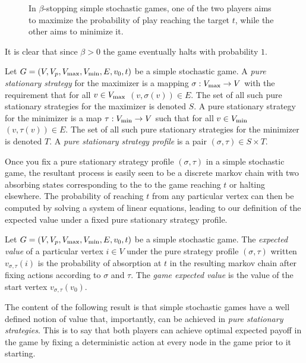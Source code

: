 \begin{figure}[h]
  \centering
  
  \caption{In $\beta$-stopping simple stochastic games, one of the two players aims to maximize the probability
  of play reaching the target $t$, while the other aims to minimize it.}
\end{figure}

It is clear that since $\beta > 0$ the game eventually halts with probability $1$. 
\begin{definition}
  Let $G = (V, V_p, V_{\max}, V_{\min}, E, v_0, t)$ be a simple stochastic game. A \emph{pure stationary strategy}
  for the maximizer is a mapping $\sigma : V_{\max} \to V$ with the requirement that for all $v \in V_{\max}$
  $(v, \sigma(v)) \in E$. The set of all such pure stationary strategies for the maximizer is denoted
  $S$. A pure stationary strategy for the minimizer is a map $\tau : V_{\min} \to V$ such that
  for all $v \in V_{\min}$ 
  $(v, \tau(v)) \in E$. The set of all such pure stationary strategies for the minimizer is denoted $T$. 
  A \emph{pure stationary strategy profile} is a pair $(\sigma, \tau) \in S \times T$.
\end{definition}
Once you fix a pure stationary strategy profile $(\sigma, \tau)$
in a simple stochastic game, the resultant process is easily seen
to be a discrete markov chain with two absorbing states corresponding to
the to the game reaching $t$ or halting elsewhere. The probability
of reaching $t$ from any particular vertex can then be computed 
by solving a system of linear equations, leading to our definition of the expected value under 
a fixed pure stationary strategy profile.
\begin{definition}
  Let $G = (V, V_p, V_{\max}, V_{\min}, E, v_0, t)$ be a simple stochastic game.
  The \emph{expected value} of
  a particular vertex $i \in V$ under the pure strategy profile 
  $(\sigma, \tau)$ written $v_{\sigma, \tau}(i)$ is the probability
  of absorption at $t$ in the resulting markov chain after fixing actions
  according to $\sigma$ and $\tau$.
  The \emph{game expected value} is the value of the start vertex $v_{\sigma, \tau}(v_0)$.
\end{definition}
The content of the following result is that simple stochastic games have a well defined
notion of value that, importantly, can be achieved in \emph{pure stationary strategies}.
This is to say that both players can achieve optimal expected payoff in the game
by fixing a deterministic action at every node in the game prior to it starting.
